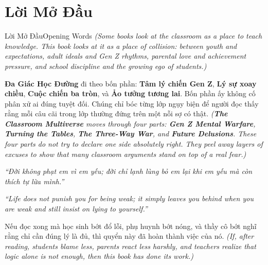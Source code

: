 \chapter*{Lời Mở Đầu}

\begin{truyen}{Lời Mở Đầu}{Opening Words}
\textit{(Some books look at the classroom as a place to teach knowledge. This book looks at it as a place of collision: between youth and expectations, adult ideals and Gen Z rhythms, parental love and achievement pressure, and school discipline and the growing ego of students.)}

\textbf{Đa Giác Học Đường} đi theo bốn phần: \textbf{Tâm lý chiến Gen Z}, \textbf{Lý sự xoay chiều}, \textbf{Cuộc chiến ba tròn}, và \textbf{Ảo tưởng tương lai}. Bốn phần ấy không cố phân xử ai đúng tuyệt đối. Chúng chỉ bóc từng lớp ngụy biện để người đọc thấy rằng mỗi câu cãi trong lớp thường đứng trên một nỗi sợ có thật.
\textit{(\textbf{The Classroom Multiverse} moves through four parts: \textbf{Gen Z Mental Warfare}, \textbf{Turning the Tables}, \textbf{The Three-Way War}, and \textbf{Future Delusions}. These four parts do not try to declare one side absolutely right. They peel away layers of excuses to show that many classroom arguments stand on top of a real fear.)}

\begin{center}
\textit{\color{bookprimary}``Đời không phạt em vì em yếu; đời chỉ lạnh lùng bỏ em lại khi em yếu mà còn thích tự lừa mình.''}

\textit{\color{bookprimary}``Life does not punish you for being weak; it simply leaves you behind when you are weak and still insist on lying to yourself.''}
\end{center}

Nếu đọc xong mà học sinh bớt đổ lỗi, phụ huynh bớt nóng, và thầy cô bớt nghĩ rằng chỉ cần đúng lý là đủ, thì quyển này đã hoàn thành việc của nó.
\textit{(If, after reading, students blame less, parents react less harshly, and teachers realize that logic alone is not enough, then this book has done its work.)}
\end{truyen}

